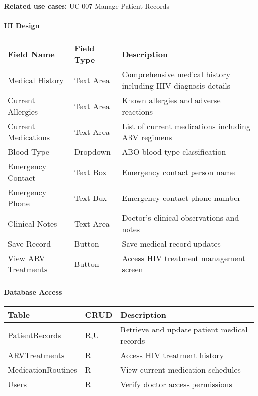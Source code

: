 \documentclass[12pt,a4paper]{article}
\begin{document}
\textbf{Related use cases:} UC-007 Manage Patient Records

\paragraph{UI Design}

\begin{longtable}{|p{3cm}|p{3cm}|p{8cm}|}
\hline
\textbf{Field Name} & \textbf{Field Type} & \textbf{Description} \\
\hline
Medical History & Text Area & Comprehensive medical history including HIV diagnosis details \\
\hline
Current Allergies & Text Area & Known allergies and adverse reactions \\
\hline
Current Medications & Text Area & List of current medications including ARV regimens \\
\hline
Blood Type & Dropdown & ABO blood type classification \\
\hline
Emergency Contact & Text Box & Emergency contact person name \\
\hline
Emergency Phone & Text Box & Emergency contact phone number \\
\hline
Clinical Notes & Text Area & Doctor's clinical observations and notes \\
\hline
Save Record & Button & Save medical record updates \\
\hline
View ARV Treatments & Button & Access HIV treatment management screen \\
\hline
\end{longtable}

\paragraph{Database Access}

\begin{longtable}{|p{3cm}|p{2cm}|p{9cm}|}
\hline
\textbf{Table} & \textbf{CRUD} & \textbf{Description} \\
\hline
PatientRecords & R,U & Retrieve and update patient medical records \\
\hline
ARVTreatments & R & Access HIV treatment history \\
\hline
MedicationRoutines & R & View current medication schedules \\
\hline
Users & R & Verify doctor access permissions \\
\hline
\end{longtable}
\end{document}
